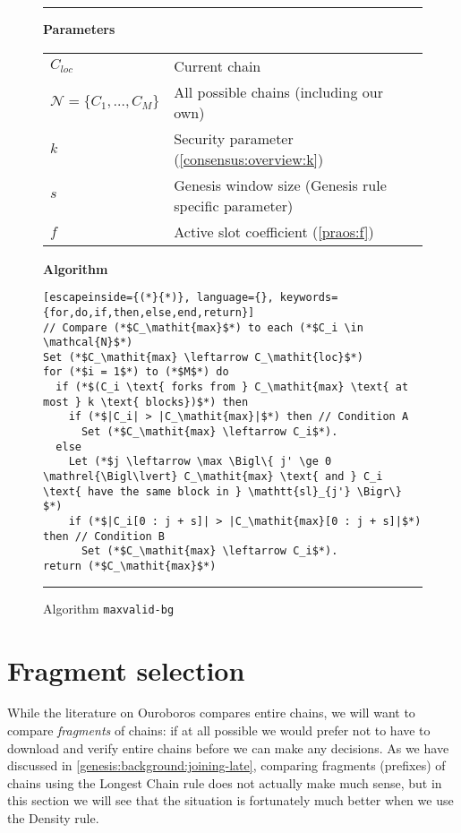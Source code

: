 \begin{figure}
\hrule

\textbf{Parameters} \\[0.5em]
\begin{tabular}{ll}
$C_\mathit{loc}$ & Current chain \\
$\mathcal{N} = \{C_1, \ldots, C_M\}$ & All possible chains (including our own) \\
$k$ & Security parameter (\cref{consensus:overview:k}) \\
$s$ & Genesis window size (Genesis rule specific parameter) \\
$f$ & Active slot coefficient (\cref{praos:f}) \\[1em]
\end{tabular}

\textbf{Algorithm}

\begin{lstlisting}[escapeinside={(*}{*)}, language={}, keywords={for,do,if,then,else,end,return}]
// Compare (*$C_\mathit{max}$*) to each (*$C_i \in \mathcal{N}$*)
Set (*$C_\mathit{max} \leftarrow C_\mathit{loc}$*)
for (*$i = 1$*) to (*$M$*) do
  if (*$(C_i \text{ forks from } C_\mathit{max} \text{ at most } k \text{ blocks})$*) then
    if (*$|C_i| > |C_\mathit{max}|$*) then // Condition A
      Set (*$C_\mathit{max} \leftarrow C_i$*).
  else
    Let (*$j \leftarrow \max \Bigl\{ j' \ge 0 \mathrel{\Bigl\lvert} C_\mathit{max} \text{ and } C_i \text{ have the same block in } \mathtt{sl}_{j'} \Bigr\} $*)
    if (*$|C_i[0 : j + s]| > |C_\mathit{max}[0 : j + s]|$*) then // Condition B
      Set (*$C_\mathit{max} \leftarrow C_i$*).
return (*$C_\mathit{max}$*)
\end{lstlisting}

\hrule
\caption{\label{genesis:maxvalid-bg}Algorithm \texttt{maxvalid-bg}}
\end{figure}

\section{Fragment selection}
\label{genesis:fragment-selection}

While the literature on Ouroboros compares entire chains, we will want to
compare \emph{fragments} of chains: if at all possible we would prefer not to
have to download and verify entire chains before we can make any decisions. As
we have discussed in \cref{genesis:background:joining-late}, comparing fragments
(prefixes) of chains using the Longest Chain rule does not actually make much
sense, but in this section we will see that the situation is fortunately much
better when we use the Density rule.

